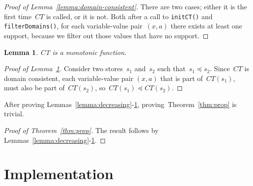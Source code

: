 \documentclass[a4paper,11pt]{article}
\newtheorem{lemma}[theorem]{Lemma}
\newcommand{\T}[1]{\texttt{#1}}
\newcommand{\Thmref}[1]{Theorem~\ref{#1}}
\newcommand{\Lemmaref}[1]{Lemma~\ref{#1}}
\numberwithin{equation}{section}
\begin{document}
\begin{proof}[Proof of \Lemmaref{lemma:domain-consistent}]
  There are two cases; either it is the first time~$CT$ is called, or it
  is not. Both after a call to \T{initCT()} and \T{filterDomains()}, 
  for each variable-value
  pair~$(x,a)$ there exists at least one support, because we filter out those
  values that have no support.
\end{proof}

\begin{lemma}\label{lemma:monotonic}
  CT is a monotonic function.
\end{lemma}

\begin{proof}[Proof of \Lemmaref{lemma:monotonic}]
  Consider two stores~$s_1$ and~$s_2$ such that~$s_1 \preceq s_2$.
  Since~$CT$ is domain consistent, each variable-value pair $(x,a)$
  that is part of~$CT(s_1)$, must also be part of~$CT(s_2)$,
  so~$CT(s_1) \preceq CT(s_2)$.
\end{proof}


After proving Lemmas~\ref{lemma:decreasing}-\ref{lemma:monotonic},
proving~\Thmref{thm:prop} is trivial.

\begin{proof}[Proof of \Thmref{thm:prop}]
  The result follows by Lemmas~\ref{lemma:decreasing}-\ref{lemma:monotonic}.
\end{proof}

\section{Implementation}
\label{sec:implementation}

\end{document}
